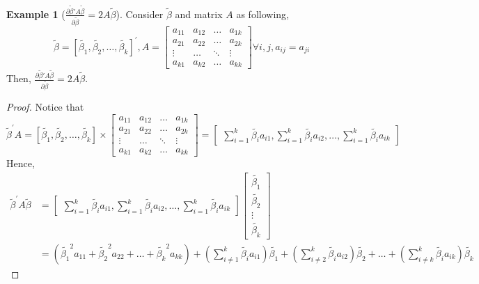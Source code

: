 \documentclass[12pt, a4paper]{article}
\theoremstyle{definition}
\newtheorem{example}{Example}
\begin{document}
\begin{example}[$\frac{\partial \tilde{\beta}'A\tilde{\beta}}{\partial \tilde{\beta}}=2A\tilde{\beta}$]
Consider $\tilde{\beta}$ and matrix $A$ as following,
\[
 \tilde{\beta}=[\tilde{\beta_1},\tilde{\beta_2},\dots,\tilde{\beta_k}]^{'},
 A=\begin{bmatrix}
 a_{11} & a_{12} & \dots & a_{1k} \\
 a_{21} & a_{22} & \dots & a_{2k} \\
 \vdots & \dots & \ddots & \vdots \\
 a_{k1} & a_{k2} & \dots & a_{kk}
 \end{bmatrix} \forall{i,j}, a_{ij}=a_{ji}
\]
Then, $\frac{\partial \tilde{\beta}'A\tilde{\beta}}{\partial \tilde{\beta}}=2A\tilde{\beta}$.

 
\begin{proof} 
Notice that
\[
 \tilde{\beta}^{'}A = [\tilde{\beta_1},\tilde{\beta_2},\dots,\tilde{\beta_k}] \times \begin{bmatrix}
 a_{11} & a_{12} & \dots & a_{1k} \\
 a_{21} & a_{22} & \dots & a_{2k} \\
 \vdots & \dots & \ddots & \vdots \\
 a_{k1} & a_{k2} & \dots & a_{kk}
 \end{bmatrix} = \begin{bmatrix}
 \sum\limits_{i=1}^k \tilde{\beta_i}a_{i1}, \sum\limits_{i=1}^k \tilde{\beta_i}a_{i2},\dots, \sum\limits_{i=1}^k \tilde{\beta_i}a_{ik}
 \end{bmatrix} 
 \]
Hence,
\begin{align*}
 \tilde{\beta}^{'}A\tilde{\beta} &= \begin{bmatrix}
 \sum\limits_{i=1}^k \tilde{\beta_i}a_{i1}, \sum\limits_{i=1}^k \tilde{\beta_i}a_{i2},\dots, \sum\limits_{i=1}^k \tilde{\beta_i}a_{ik}
 \end{bmatrix} \begin{bmatrix}
 \tilde{\beta_1}\\
 \tilde{\beta_2}\\
 \vdots\\
 \tilde{\beta_k}
 \end{bmatrix} \\
 &= (\tilde{\beta_1}^2a_{11}+\tilde{\beta_2}^2a_{22}+\dots+\tilde{\beta_k}^2a_{kk})+(\sum\limits_{i\neq1}^k \tilde{\beta_i}a_{i1})\tilde{\beta_1}+
 (\sum\limits_{i\neq2}^k \tilde{\beta_i}a_{i2})\tilde{\beta_2}+
 \dots+(\sum\limits_{i\neq k}^k \tilde{\beta_i}a_{ik})\tilde{\beta_k}
 \end{align*}

\end{proof}
\end{example}
\end{document}
